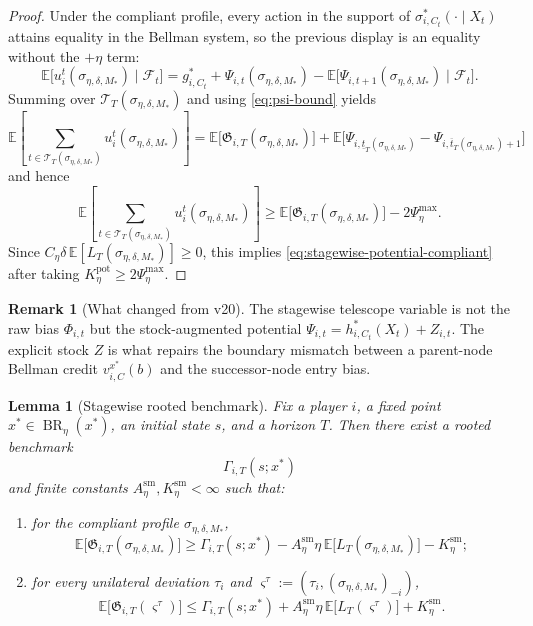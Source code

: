 \documentclass[12pt]{article}
\newtheorem{lemma}[theorem]{Lemma}
\theoremstyle{definition}
\newtheorem{remark}[theorem]{Remark}
\newcommand{\E}{\mathbb{E}}
\newcommand{\1}{\mathbf{1}}
\newcommand{\cF}{\mathcal{F}}
\DeclareMathOperator{\BR}{BR}
\begin{document}
\begin{proof}
Under the compliant profile, every action in the support of
$\sigma_{i,C_t}^*(\cdot\mid X_t)$ attains equality in the Bellman system, so the
previous display is an equality without the $+\eta$ term:
\[
\E\bigl[u_i^t(\sigma_{\eta,\delta,M_*})\mid \cF_t\bigr]
=
g_{i,C_t}^*
+
\Psi_{i,t}(\sigma_{\eta,\delta,M_*})
-
\E\bigl[\Psi_{i,t+1}(\sigma_{\eta,\delta,M_*})\mid \cF_t\bigr].
\]
Summing over $\mathcal T_T(\sigma_{\eta,\delta,M_*})$ and using
\eqref{eq:psi-bound} yields
\[
\E\left[
\sum_{t\in\mathcal T_T(\sigma_{\eta,\delta,M_*})}
u_i^t(\sigma_{\eta,\delta,M_*})
\right]
=
\E\bigl[\mathfrak G_{i,T}(\sigma_{\eta,\delta,M_*})\bigr]
+
\E\bigl[
\Psi_{i,\underline t_T(\sigma_{\eta,\delta,M_*})}
-
\Psi_{i,\overline t_T(\sigma_{\eta,\delta,M_*})+1}
\bigr]
\]
and hence
\[
\E\left[
\sum_{t\in\mathcal T_T(\sigma_{\eta,\delta,M_*})}
u_i^t(\sigma_{\eta,\delta,M_*})
\right]
\ge
\E\bigl[\mathfrak G_{i,T}(\sigma_{\eta,\delta,M_*})\bigr]
-
2\Psi_\eta^{\max}.
\]
Since $C_\eta\delta\,\E[L_T(\sigma_{\eta,\delta,M_*})]\ge 0$, this implies
\eqref{eq:stagewise-potential-compliant} after taking
$K_\eta^{\mathrm{pot}}\ge 2\Psi_\eta^{\max}$.
\end{proof}

\begin{remark}[What changed from v20]
The stagewise telescope variable is not the raw bias $\Phi_{i,t}$ but the
stock-augmented potential $\Psi_{i,t}=h_{i,C_t}^*(X_t)+Z_{i,t}$. The explicit
stock $Z$ is what repairs the boundary mismatch between a parent-node Bellman
credit $v_{i,C}^{x^*}(b)$ and the successor-node entry bias.
\end{remark}

\begin{lemma}[Stagewise rooted benchmark]
\label{lem:tree-telescoping}
Fix a player $i$, a fixed point $x^*\in\BR_\eta(x^*)$, an initial state $s$, and
a horizon $T$. Then there exist a rooted benchmark
\[
\Gamma_{i,T}(s;x^*)
\]
and finite constants $A_\eta^{\mathrm{sm}},K_\eta^{\mathrm{sm}}<\infty$ such that:
\begin{enumerate}[label=\textnormal{(\alph*)},leftmargin=2.8em]
\item for the compliant profile $\sigma_{\eta,\delta,M_*}$,
\begin{equation}
\label{eq:rooted-benchmark-compliant}
\E\bigl[\mathfrak G_{i,T}(\sigma_{\eta,\delta,M_*})\bigr]
\ge
\Gamma_{i,T}(s;x^*)
-
A_\eta^{\mathrm{sm}}\eta\,
\E\bigl[L_T(\sigma_{\eta,\delta,M_*})\bigr]
-
K_\eta^{\mathrm{sm}};
\end{equation}
\item for every unilateral deviation $\tau_i$ and
$\varsigma^\tau:=(\tau_i,(\sigma_{\eta,\delta,M_*})_{-i})$,
\begin{equation}
\label{eq:rooted-benchmark-deviator}
\E\bigl[\mathfrak G_{i,T}(\varsigma^\tau)\bigr]
\le
\Gamma_{i,T}(s;x^*)
+
A_\eta^{\mathrm{sm}}\eta\,
\E\bigl[L_T(\varsigma^\tau)\bigr]
+
K_\eta^{\mathrm{sm}}.
\end{equation}
\end{enumerate}
\end{lemma}
\end{document}
